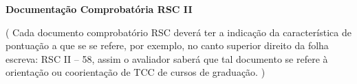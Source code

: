 \label{documentacao-probatoria-rsc-ii}

\begin{center}
	\begin{LARGE}
		\textbf{Documentação Comprobatória RSC II}
	\end{LARGE}
\end{center}

\ifcomentarios
\begin{center}
	{\color{red}
		( Cada documento comprobatório RSC deverá ter a indicação da característica de pontuação a que se se refere, por exemplo, no canto superior direito da folha escreva: RSC II – 58, assim o avaliador saberá que tal documento se refere à orientação ou coorientação  de TCC de cursos de graduação. )
	}
\end{center}
\fi